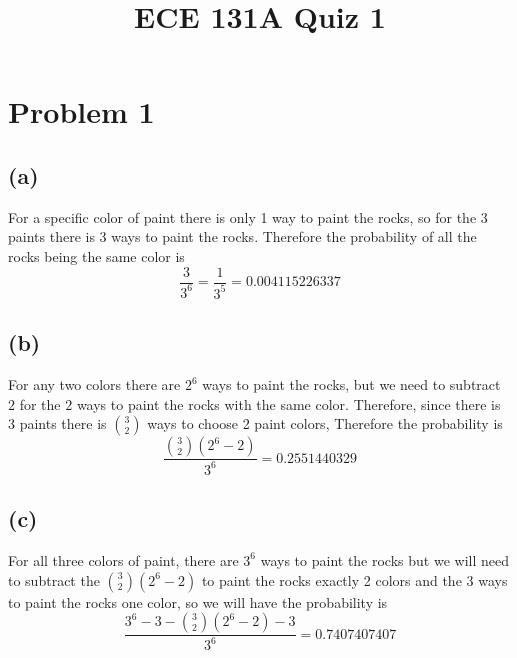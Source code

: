 
\title{ECE 131A Quiz 1}

\maketitle
\section*{Problem 1}
\subsection*{(a)}
For a specific color of paint there is only 1 way to paint the rocks, so for the 3 paints there is 
3 ways to paint the rocks. Therefore the probability of all the rocks being the same color is 
$$\frac{3}{3^6}=\frac{1}{3^5}=\boxed{0.004115226337}$$
\subsection*{(b)}
For any two colors there are $2^6$ ways to paint the rocks, but we need
to subtract $2$ for the $2$ ways to paint the rocks with the same color. 
Therefore, since there is 3 paints there is $3\choose 2$ ways to choose 2 paint
colors, Therefore the probability is
$$\frac{{3\choose 2}(2^6-2)}{3^6}=\boxed{0.2551440329}$$ 
\subsection*{(c)}
For all three colors of paint, there are $3^6$ ways to paint the rocks
but we will need to subtract the ${3\choose 2}(2^6-2)$ to 
paint the rocks exactly 2 colors and the $3$ ways to paint the rocks 
one color, so we will have the probability is 
$$\frac{3^6-3-{3\choose 2}(2^6-2)-3}{3^6}=\boxed{0.7407407407}$$
